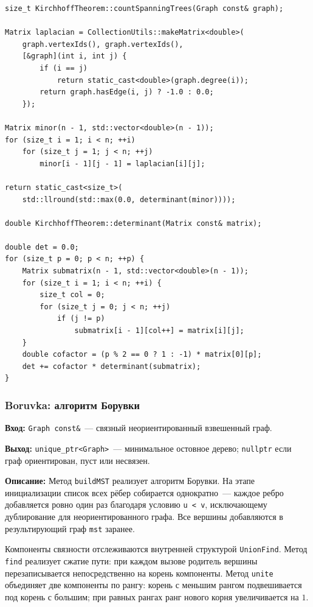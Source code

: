 \begin{lstlisting}[style=cppstyle, caption={Построение матрицы Лапласа, минора и вычисление определителя (KirchhoffTheorem.cc)}]
size_t KirchhoffTheorem::countSpanningTrees(Graph const& graph);

Matrix laplacian = CollectionUtils::makeMatrix<double>(
    graph.vertexIds(), graph.vertexIds(),
    [&graph](int i, int j) {
        if (i == j)
            return static_cast<double>(graph.degree(i));
        return graph.hasEdge(i, j) ? -1.0 : 0.0;
    });

Matrix minor(n - 1, std::vector<double>(n - 1));
for (size_t i = 1; i < n; ++i)
    for (size_t j = 1; j < n; ++j)
        minor[i - 1][j - 1] = laplacian[i][j];

return static_cast<size_t>(
    std::llround(std::max(0.0, determinant(minor))));

double KirchhoffTheorem::determinant(Matrix const& matrix);

double det = 0.0;
for (size_t p = 0; p < n; ++p) {
    Matrix submatrix(n - 1, std::vector<double>(n - 1));
    for (size_t i = 1; i < n; ++i) {
        size_t col = 0;
        for (size_t j = 0; j < n; ++j)
            if (j != p)
                submatrix[i - 1][col++] = matrix[i][j];
    }
    double cofactor = (p % 2 == 0 ? 1 : -1) * matrix[0][p];
    det += cofactor * determinant(submatrix);
}
\end{lstlisting}

\subsubsection{Boruvka: алгоритм Борувки}

\textbf{Вход:} \texttt{Graph const\&}~--- связный неориентированный
взвешенный граф.

\textbf{Выход:} \texttt{unique\_ptr<Graph>}~--- минимальное остовное
дерево; \texttt{nullptr} если граф ориентирован, пуст или несвязен.

\textbf{Описание:} Метод \texttt{buildMST} реализует алгоритм Борувки.
На этапе инициализации список всех рёбер собирается однократно~---
каждое ребро добавляется ровно один раз благодаря условию \texttt{u < v},
исключающему дублирование для неориентированного графа. Все вершины
добавляются в результирующий граф \texttt{mst} заранее.

Компоненты связности отслеживаются внутренней структурой
\texttt{UnionFind}. Метод \texttt{find} реализует сжатие пути:
при каждом вызове родитель вершины перезаписывается непосредственно
на корень компоненты. Метод \texttt{unite} объединяет две компоненты
по рангу: корень с меньшим рангом подвешивается под корень с большим;
при равных рангах ранг нового корня увеличивается на $1$.

